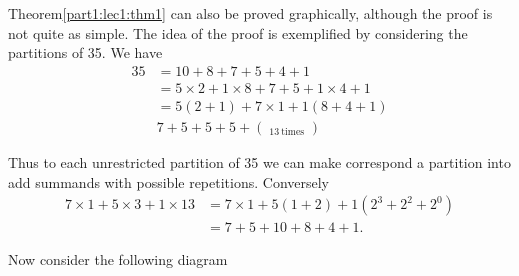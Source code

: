 Theorem\pageoriginale  \ref{part1:lec1:thm1} can also be proved graphically, although the proof is not
quite as simple. The idea of the proof is exemplified by considering
the partitions of 35. We have
\begin{align*}
  35 & = 10+ 8+7+ 5+ 4+1\\
  & = 5 \times 2+1\times 8+7+5+1\times 4+1\\
  & = 5(2+1) +7\times 1+1(8+4+1)\\
  & 7+5 +5+5+\left(\mathop{\underbrace{1+\cdots +1}}_{13 ~\text{times}}\right)
\end{align*}

Thus to each unrestricted partition of 35 we can make correspond a
partition into add summands with possible repetitions. Conversely 
\begin{align*}
  7 \times 1 + 5 \times 3+ 1 \times 13 & = 7 \times 1 + 5(1+2) +1 (2^3 +
  2^2 + 2^0)\\
  & = 7+ 5 +10 +8 + 4+ 1.
\end{align*}

Now consider the following diagram
\begin{figure}[H]
\end{figure}

